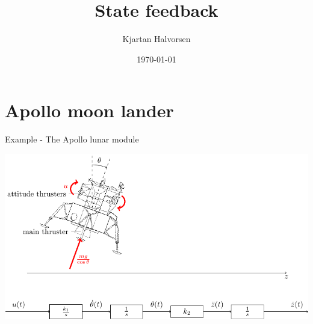\documentclass[presentation,aspectratio=1610]{beamer}
\author{Kjartan Halvorsen}
\date{\today}
\title{State feedback}
\begin{document}
\maketitle

\section{Apollo moon lander}
\label{sec:org1fe45b2}
\begin{frame}[label={sec:org431d74e}]{Example - The Apollo lunar module}
\begin{center}
\includegraphics[width=\linewidth]{fig-apollo}
\end{center}
\end{frame}
\end{document}
